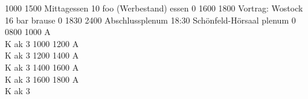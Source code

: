 \documentclass[a5paper,9pt]{scrreprt}
\begin{document}
\begin{timetable}
   {1000} {1500} {Mittagessen}      {10} {foo (Werbestand)}  {} {essen}   {0}
   {1600} {1800} {Vortrag: Wostock} {16} {bar}               {} {brause}  {0}
   {1830} {2400} {Abschlussplenum}  {18:30} {Schönfeld-Hörsaal} {} {plenum}  {0}
   {0800} {1000} {\hfill A\\ \hfill K} {} {}               {} {ak}      {3}
   {1000} {1200} {\hfill A\\ \hfill K} {} {}               {} {ak}      {3}
   {1200} {1400} {\hfill A\\ \hfill K} {} {}               {} {ak}      {3}
   {1400} {1600} {\hfill A\\ \hfill K} {} {}               {} {ak}      {3}
   {1600} {1800} {\hfill A\\ \hfill K} {} {}               {} {ak}      {3}
\end{timetable}
\end{document}
